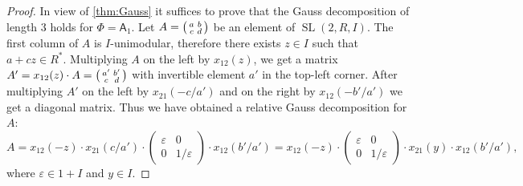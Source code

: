 \documentclass[11pt]{amsart}
\theoremstyle{plain}
\numberwithin{equation}{section}
\numberwithin{lemma}{section}
\theoremstyle{definition}
\theoremstyle{remark}
\DeclareMathOperator{\SL}{SL}
\newcommand{\rA}{\mathsf{A}}
\begin{document}
\begin{proof}
In view of \cref{thm:Gauss} it suffices to prove that the Gauss decomposition of length $3$ holds for $\Phi=\rA_1$. Let $A=\begin{psmallmatrix}a & b \\ c & d\end{psmallmatrix}$ be an element of $\SL(2, R, I)$.
The first column of $A$ is $I$-unimodular, therefore there exists $z\in I$ such that $a+cz\in R^*$.
Multiplying $A$ on the left by $x_{12}(z)$, we get a matrix $A'=x_{12}(z)\cdot A=\begin{psmallmatrix}a' & b' \\ c & d\end{psmallmatrix}$ with invertible element $a'$ in the top-left corner.
After multiplying $A'$ on the left by $x_{21}(-c/a')$ and on the right by $x_{12}(-b'/a')$ we get a diagonal matrix. 
Thus we have obtained a relative Gauss decomposition for $A$:
\begin{equation*}
A=x_{12}(-z)\cdot x_{21}(c/a')\cdot
\begin{pmatrix} \varepsilon & 0 \\ 0 & 1/\varepsilon \end{pmatrix}
\cdot x_{12}(b'/a')=x_{12}(-z)\cdot
\begin{pmatrix} \varepsilon & 0 \\ 0 & 1/\varepsilon \end{pmatrix}
\cdot x_{21}(y) \cdot x_{12}(b'/a'), 
\end{equation*}
where $\varepsilon\in 1+I$ and $y\in I$. \end{proof}
\end{document}
